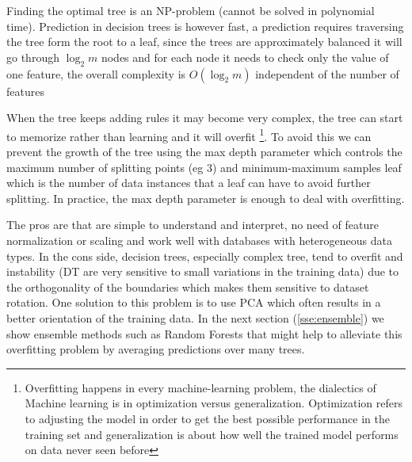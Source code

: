 \documentclass[11pt]{article}
\theoremstyle{definition}
\theoremstyle{remark}
\begin{document}
Finding the optimal tree is an NP-problem (cannot be solved in polynomial time). Prediction in decision trees is however fast, a prediction requires traversing the tree form the root to a leaf, since the trees are approximately balanced it will go through $\log_{2}m$ nodes and for each node it needs to check only the value of one feature, the overall complexity is $O(\log_{2}m)$ independent of the number of features

When the tree keeps adding rules it may become very complex, the tree can start to memorize rather than learning  and it will overfit \footnote{Overfitting happens in every machine-learning problem, the dialectics of Machine learning is in optimization versus generalization. Optimization refers to adjusting the model in order to get the best possible performance in the training set and generalization is about how well the trained model performs on data never seen before}. To avoid this we can prevent the growth of the tree using the max depth parameter which controls the maximum number of splitting points (eg 3) and minimum-maximum samples leaf which is the number of data instances that a leaf can have to avoid further splitting. In practice, the max depth parameter is enough to deal with overfitting.

The pros are that are simple to understand and interpret, no need of feature normalization or scaling and work well with databases with heterogeneous data types. In the cons side, decision trees, especially complex tree, tend to overfit and instability (DT are very sensitive to small variations in the training data) due to the orthogonality of the boundaries which makes them sensitive to dataset rotation. 
One solution to this problem is to use PCA which often results in a better orientation of the training data. In the next section (\ref{sse:ensemble}) we show ensemble methods such as Random Forests that might help to alleviate this overfitting problem by averaging predictions over many trees.
\end{document}
